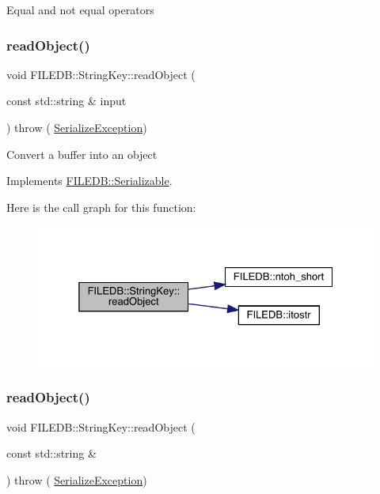Equal and not equal operators \mbox{\label{classFILEDB_1_1StringKey_a25cefb184c88bc5bf871245e82ea21f9}} 
\subsubsection{\texorpdfstring{readObject()}{readObject()}\hspace{0.1cm}{\footnotesize\ttfamily [1/2]}}
{\footnotesize\ttfamily void F\+I\+L\+E\+D\+B\+::\+String\+Key\+::read\+Object (\begin{DoxyParamCaption}\item[{const std\+::string \&}]{input }\end{DoxyParamCaption}) throw ( \mbox{\hyperlink{classFILEDB_1_1SerializeException}{Serialize\+Exception}}) \hspace{0.3cm}{\ttfamily [virtual]}}

Convert a buffer into an object 

Implements \mbox{\hyperlink{classFILEDB_1_1Serializable_a21a5831fa4f65790490a8a5eba9fcab2}{F\+I\+L\+E\+D\+B\+::\+Serializable}}.

Here is the call graph for this function\+:\nopagebreak
\begin{figure}[H]
\begin{center}
\leavevmode
\includegraphics[width=325pt]{d2/da7/classFILEDB_1_1StringKey_a25cefb184c88bc5bf871245e82ea21f9_cgraph}
\end{center}
\end{figure}
\mbox{\label{classFILEDB_1_1StringKey_a25cefb184c88bc5bf871245e82ea21f9}} 
\subsubsection{\texorpdfstring{readObject()}{readObject()}\hspace{0.1cm}{\footnotesize\ttfamily [2/2]}}
{\footnotesize\ttfamily void F\+I\+L\+E\+D\+B\+::\+String\+Key\+::read\+Object (\begin{DoxyParamCaption}\item[{const std\+::string \&}]{ }\end{DoxyParamCaption}) throw ( \mbox{\hyperlink{classFILEDB_1_1SerializeException}{Serialize\+Exception}}) \hspace{0.3cm}{\ttfamily [virtual]}}

